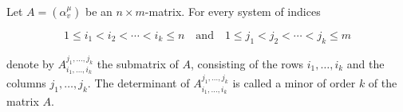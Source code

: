 Let $A = (\alpha_v^\mu)$ be an $n \times m$-matrix. For every system of indices

$$1 \leq i_1 < i_2 < \cdots < i_k \leq n \quad \text{and} \quad 1 \leq j_1 < j_2 < \cdots < j_k \leq m$$

denote by $A_{i_1, \ldots, i_k}^{j_1, \ldots, j_k}$ the submatrix of $A$, consisting of the rows $i_1, \ldots, i_k$ and the columns $j_1, \ldots, j_k$. The determinant of $A_{i_1, \ldots, i_k}^{j_1, \ldots, j_k}$ is called a minor of order $k$ of the matrix $A$.
